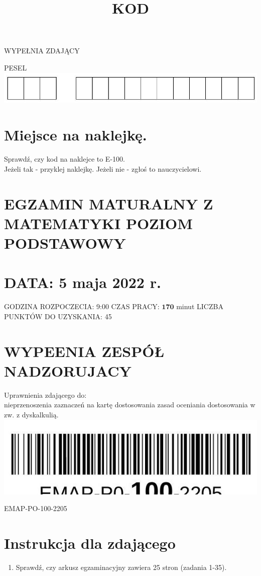 \documentclass[10pt]{article}
\title{KOD }
\author{}
\date{}
\begin{document}
\maketitle
WYPEŁNIA ZDAJĄCY

PESEL\\
\includegraphics[max width=\textwidth, center]{2024_11_21_465acd0c12fa3e05e8a7g-01}

\section*{Miejsce na naklejkę.}
Sprawdź, czy kod na naklejce to E-100.\\
Jeżeli tak - przyklej naklejkę. Jeżeli nie - zgłoś to nauczycielowi.

\section*{EGZAMIN MATURALNY Z MATEMATYKI POZIOM PODSTAWOWY}
\section*{DATA: 5 maja 2022 r.}
GODZINA ROZPOCZECIA: 9:00 CZAS PRACY: \(\mathbf{1 7 0}\) minut LICZBA PUNKTÓW DO UZYSKANIA: 45

\section*{WYPEENIA ZESPÓŁ NADZORUJACY}
Uprawnienia zdającego do:\\
nieprzenoszenia zaznaczeń na kartę dostosowania zasad oceniania dostosowania w zw. z dyskalkulią.\\
\includegraphics[max width=\textwidth, center]{2024_11_21_465acd0c12fa3e05e8a7g-01(1)}

EMAP-PO-100-2205

\section*{Instrukcja dla zdającego}
\begin{enumerate}
  \item Sprawdź, czy arkusz egzaminacyjny zawiera 25 stron (zadania 1-35).
\end{enumerate}
\end{document}

